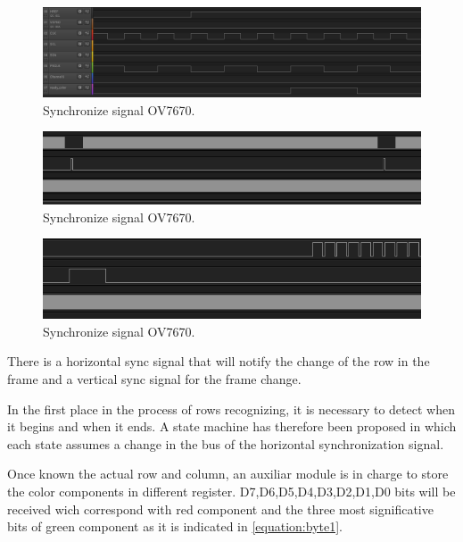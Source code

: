 		\begin{figure}[H]
		\center
		\includegraphics[scale=0.3, angle=0]{imagenes/Cuadricoptero_vision/sincronismo3}
		\caption{Synchronize signal OV7670.}
		\label{fig:sincronismo}
	\end{figure}
			\begin{figure}[H]
		\center
		\includegraphics[scale=0.5, angle=0]{imagenes/Cuadricoptero_vision/sincronismo1}
		\caption{Synchronize signal OV7670.}
		\label{fig:sincronismo1}
	\end{figure}
			\begin{figure}[H]
		\center
		\includegraphics[scale=0.6, angle=0]{imagenes/Cuadricoptero_vision/sincronismo2}
		\caption{Synchronize signal OV7670.}
		\label{fig:sincronismo3}
	\end{figure}
	
There is a horizontal sync signal that will notify the change of the row in the frame and a vertical sync signal for the frame change.
	
	In the first place in the process of rows recognizing, it is necessary to detect when it begins and when it ends. A state machine has therefore been proposed in which each state assumes a change in the bus of the horizontal synchronization signal. 
	
	Once known the actual row and column, an auxiliar module is in charge to store the color components in different register. D7,D6,D5,D4,D3,D2,D1,D0 bits will be received wich correspond with red component and the three most significative bits of green component as it is indicated in \ref{equation:byte1}.
	
